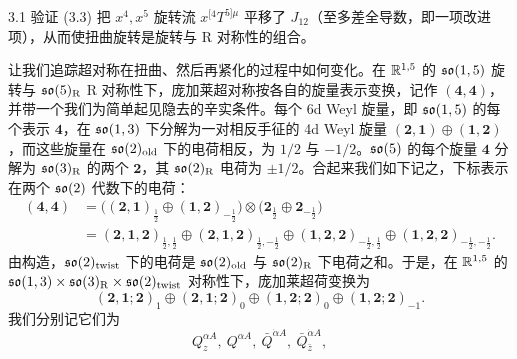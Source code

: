 \begin{exercise}{3.1}
验证 (3.3) 把 $x^4,x^5$ 旋转流 $x^{[4}T^{5]\mu}$ 平移了 $J_{12}$（至多差全导数，即一项改进项），从而使扭曲旋转是旋转与 R 对称性的组合。
\end{exercise}

让我们追踪超对称在扭曲、然后再紧化的过程中如何变化。在 $\mathbb{R}^{1,5}$ 的 $\mathfrak{so}(1,5)$ 旋转与 $\mathfrak{so}(5)_{\mathrm R}$ R 对称性下，庞加莱超对称按各自的旋量表示变换，记作 $(\mathbf{4},\mathbf{4})$，并带一个我们为简单起见隐去的辛实条件。每个 6d Weyl 旋量，即 $\mathfrak{so}(1,5)$ 的每个表示 $\mathbf{4}$，在 $\mathfrak{so}(1,3)$ 下分解为一对相反手征的 4d Weyl 旋量 $(\mathbf{2},\mathbf{1})\oplus(\mathbf{1},\mathbf{2})$，而这些旋量在 $\mathfrak{so}(2)_{\mathrm{old}}$ 下的电荷相反，为 $1/2$ 与 $-1/2$。$\mathfrak{so}(5)$ 的每个旋量 $\mathbf{4}$ 分解为 $\mathfrak{so}(3)_{\mathrm R}$ 的两个 $\mathbf{2}$，其 $\mathfrak{so}(2)_{\mathrm R}$ 电荷为 $\pm1/2$。合起来我们如下记之，下标表示在两个 $\mathfrak{so}(2)$ 代数下的电荷：
\begin{equation}
\begin{aligned}
(\mathbf{4},\mathbf{4}) &= \Big((\mathbf{2},\mathbf{1})_{\tfrac12}\oplus(\mathbf{1},\mathbf{2})_{-\tfrac12}\Big)\otimes\Big(\mathbf{2}_{\tfrac12}\oplus\mathbf{2}_{-\tfrac12}\Big)\\
&= (\mathbf{2},\mathbf{1},\mathbf{2})_{\tfrac12,\tfrac12}\oplus(\mathbf{2},\mathbf{1},\mathbf{2})_{\tfrac12,-\tfrac12}\oplus(\mathbf{1},\mathbf{2},\mathbf{2})_{-\tfrac12,\tfrac12}\oplus(\mathbf{1},\mathbf{2},\mathbf{2})_{-\tfrac12,-\tfrac12} .
\end{aligned}
\tag{3.4}
\end{equation}
由构造，$\mathfrak{so}(2)_{\mathrm{twist}}$ 下的电荷是 $\mathfrak{so}(2)_{\mathrm{old}}$ 与 $\mathfrak{so}(2)_{\mathrm R}$ 下电荷之和。于是，在 $\mathbb{R}^{1,5}$ 的 $\mathfrak{so}(1,3)\times\mathfrak{so}(3)_{\mathrm R}\times\mathfrak{so}(2)_{\mathrm{twist}}$ 对称性下，庞加莱超荷变换为
\begin{equation}
(\mathbf{2},\mathbf{1};\mathbf{2})_1\oplus(\mathbf{2},\mathbf{1};\mathbf{2})_0\oplus(\mathbf{1},\mathbf{2};\mathbf{2})_0\oplus(\mathbf{1},\mathbf{2};\mathbf{2})_{-1} .
\tag{3.5}
\end{equation}
我们分别记它们为
\begin{equation}
Q^{\alpha A}_z ,\ Q^{\alpha A} ,\ \bar Q^{\dot\alpha A} ,\ \bar Q^{\dot\alpha A}_{\bar z} ,
\tag{3.6}
\end{equation}


